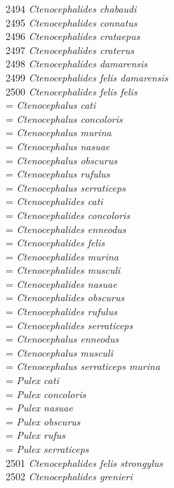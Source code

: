 \documentclass[
]{article}
\begin{document}
2494 \emph{Ctenocephalides chabaudi}\\
2495 \emph{Ctenocephalides connatus}\\
2496 \emph{Ctenocephalides crataepus}\\
2497 \emph{Ctenocephalides craterus}\\
2498 \emph{Ctenocephalides damarensis}\\
2499 \emph{Ctenocephalides felis damarensis}\\
2500 \emph{Ctenocephalides felis felis}\\
= \emph{Ctenocephalus cati}\\
= \emph{Ctenocephalus concoloris}\\
= \emph{Ctenocephalus murina}\\
= \emph{Ctenocephalus nasuae}\\
= \emph{Ctenocephalus obscurus}\\
= \emph{Ctenocephalus rufulus}\\
= \emph{Ctenocephalus serraticeps}\\
= \emph{Ctenocephalides cati}\\
= \emph{Ctenocephalides concoloris}\\
= \emph{Ctenocephalides enneodus}\\
= \emph{Ctenocephalides felis}\\
= \emph{Ctenocephalides murina}\\
= \emph{Ctenocephalides musculi}\\
= \emph{Ctenocephalides nasuae}\\
= \emph{Ctenocephalides obscurus}\\
= \emph{Ctenocephalides rufulus}\\
= \emph{Ctenocephalides serraticeps}\\
= \emph{Ctenocephalus enneodus}\\
= \emph{Ctenocephalus musculi}\\
= \emph{Ctenocephalus serraticeps murina}\\
= \emph{Pulex cati}\\
= \emph{Pulex concoloris}\\
= \emph{Pulex nasuae}\\
= \emph{Pulex obscurus}\\
= \emph{Pulex rufus}\\
= \emph{Pulex serraticeps}\\
2501 \emph{Ctenocephalides felis strongylus}\\
2502 \emph{Ctenocephalides grenieri}\\
\end{document}
